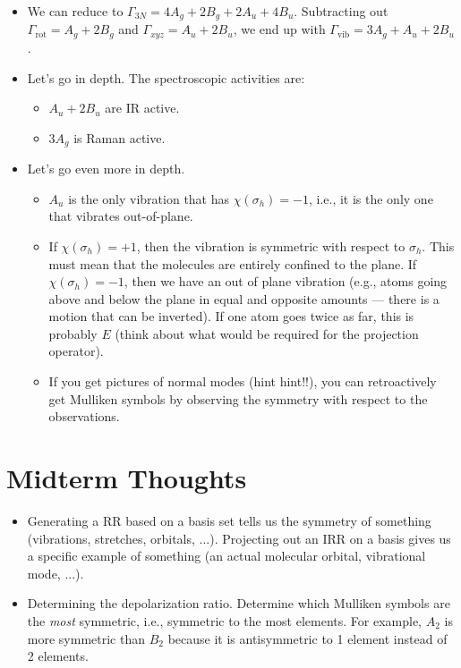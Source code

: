 \documentclass[../notes.tex]{subfiles}
\begin{document}
\begin{itemize}
\begin{itemize}
        \item We can reduce to $\Gamma_{3N}=4A_g+2B_g+2A_u+4B_u$. Subtracting out $\Gamma_\text{rot}=A_g+2B_g$ and $\Gamma_{xyz}=A_u+2B_u$, we end up with $\Gamma_\text{vib}=3A_g+A_u+2B_u$.
        \item Let's go in depth. The spectroscopic activities are:
        \begin{itemize}
            \item $A_u+2B_u$ are IR active.
            \item $3A_g$ is Raman active.
        \end{itemize}
        \item Let's go even more in depth.
        \begin{itemize}
            \item $A_u$ is the only vibration that has $\chi(\sigma_h)=-1$, i.e., it is the only one that vibrates out-of-plane.
            \item If $\chi(\sigma_h)=+1$, then the vibration is symmetric with respect to $\sigma_h$. This must mean that the molecules are entirely confined to the plane. If $\chi(\sigma_h)=-1$, then we have an out of plane vibration (e.g.,  atoms going above and below the plane in equal and opposite amounts --- there is a motion that can be inverted). If one  atom goes twice as far, this is probably $E$ (think about what would be required for the projection operator).
            \item If you get pictures of normal modes (hint hint!!), you can retroactively get Mulliken symbols by observing the symmetry with respect to the observations.
        \end{itemize}
    \end{itemize}
\end{itemize}



\section{Midterm Thoughts}
\begin{itemize}
    \item {}Generating a RR based on a basis set tells us the symmetry of something (vibrations, stretches, orbitals, ...). Projecting out an IRR on a basis gives us a specific example of something (an actual molecular orbital, vibrational mode, ...).
    \item Determining the depolarization ratio. Determine which Mulliken symbols are the \emph{most} symmetric, i.e., symmetric to the most elements. For example, $A_2$ is more symmetric than $B_2$ because it is antisymmetric to 1 element instead of 2 elements.
\end{itemize}
\end{document}
